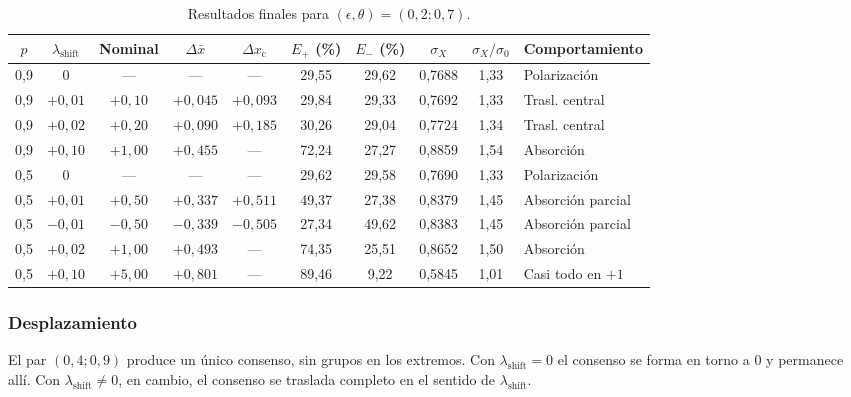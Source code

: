 \documentclass[11pt,a4paper]{article}
\begin{document}
\begin{table}[htbp]
\centering
\caption{Resultados finales para $(\epsilon,\theta)=(0{,}2;0{,}7)$.}
\label{tab:shift-esc-02}
\footnotesize
\setlength{\tabcolsep}{4pt}
\begin{tabular}{cccccccccl}
\toprule
$p$ & $\lambda_{\mathrm{shift}}$ & Nominal & $\Delta\bar{x}$ & $\Delta x_{\mathrm{c}}$ & $E_{+}$ (\%) & $E_{-}$ (\%) & $\sigma_X$ & $\sigma_X/\sigma_0$ & Comportamiento \\
\midrule
0,9 & $0$        & ---        & ---        & ---        & 29,55 & 29,62 & 0,7688 & 1,33 & Polarización \\
0,9 & $+0{,}01$  & $+0{,}10$  & $+0{,}045$ & $+0{,}093$ & 29,84 & 29,33 & 0,7692 & 1,33 & Trasl. central \\
0,9 & $+0{,}02$  & $+0{,}20$  & $+0{,}090$ & $+0{,}185$ & 30,26 & 29,04 & 0,7724 & 1,34 & Trasl. central \\
0,9 & $+0{,}10$  & $+1{,}00$  & $+0{,}455$ & ---        & 72,24 & 27,27 & 0,8859 & 1,54 & Absorción \\
0,5 & $0$        & ---        & ---        & ---        & 29,62 & 29,58 & 0,7690 & 1,33 & Polarización \\
0,5 & $+0{,}01$  & $+0{,}50$  & $+0{,}337$ & $+0{,}511$ & 49,37 & 27,38 & 0,8379 & 1,45 & Absorción parcial \\
0,5 & $-0{,}01$  & $-0{,}50$  & $-0{,}339$ & $-0{,}505$ & 27,34 & 49,62 & 0,8383 & 1,45 & Absorción parcial \\
0,5 & $+0{,}02$  & $+1{,}00$  & $+0{,}493$ & ---        & 74,35 & 25,51 & 0,8652 & 1,50 & Absorción \\
0,5 & $+0{,}10$  & $+5{,}00$  & $+0{,}801$ & ---        & 89,46 & 9,22  & 0,5845 & 1,01 & Casi todo en $+1$ \\
\bottomrule
\end{tabular}
\end{table}

\subsubsection{Desplazamiento}
\label{sec:shift-esc-desplazamiento}

El par $(0{,}4;0{,}9)$ produce un único consenso, sin grupos en los extremos. Con $\lambda_{\mathrm{shift}}=0$ el consenso se forma en torno a $0$ y permanece allí. Con $\lambda_{\mathrm{shift}}\neq0$, en cambio, el consenso se traslada completo en el sentido de $\lambda_{\mathrm{shift}}$.
\end{document}
